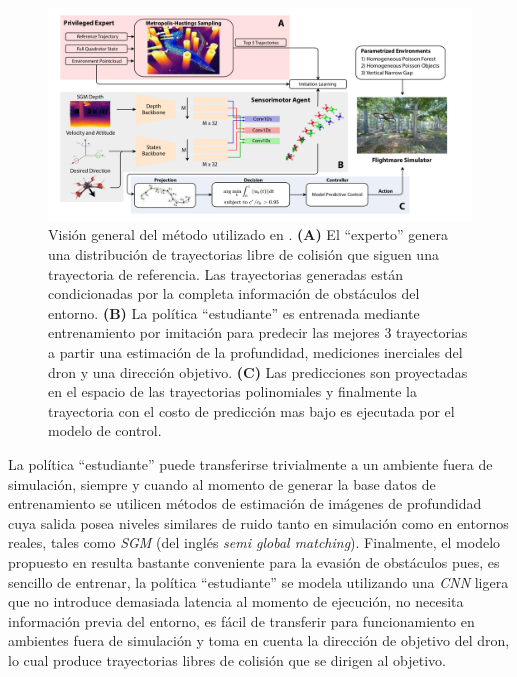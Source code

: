     \begin{figure}[H]
        \centering
        \includegraphics[scale=0.3]{partes/img/agile-autonomy-overview.png}
        \caption[Visión general del método del método utilizado en \textit{Learning high-speed flight in the wild}]{Visión general del método utilizado en \cite{Loquercio2021}. \textbf{(A)} El ``experto'' genera una distribución de trayectorias libre de colisión que siguen una trayectoria de referencia. Las trayectorias generadas están condicionadas por la completa información de obstáculos del entorno. \textbf{(B)} La política ``estudiante'' es entrenada mediante entrenamiento por imitación para predecir las mejores 3 trayectorias a partir una estimación de la profundidad, mediciones inerciales del dron y una dirección objetivo. \textbf{(C)} Las predicciones son proyectadas en el espacio de las trayectorias polinomiales y finalmente la trayectoria con el costo de predicción mas bajo es ejecutada por el modelo de control. }
        \label{fig:agile-autonomy-overview}
    \end{figure}
    
    La política ``estudiante'' puede transferirse trivialmente a un ambiente fuera de simulación, siempre y cuando al momento de generar la base datos de entrenamiento se utilicen métodos de estimación de imágenes de profundidad cuya salida posea niveles similares de ruido tanto en simulación como en entornos reales, tales como \textit{SGM} \cite{Hirschmüller2007} (del inglés \textit{semi global matching}). Finalmente, el modelo propuesto en \cite{Loquercio2021} resulta bastante conveniente para la evasión de obstáculos pues, es sencillo de entrenar, la política ``estudiante'' se modela utilizando una \textit{CNN} ligera \cite{Howard2019} que no introduce demasiada latencia al momento de ejecución, no necesita información previa del entorno, es fácil de transferir para funcionamiento en ambientes fuera de simulación y toma en cuenta la dirección de objetivo del dron, lo cual produce trayectorias libres de colisión que se dirigen al objetivo.

